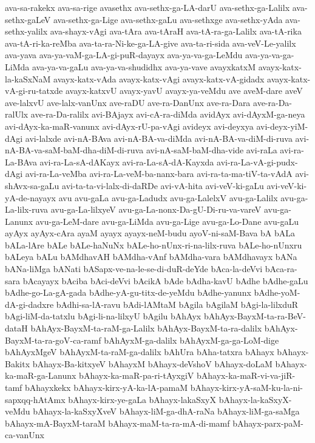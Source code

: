 {ava-sa-rakekx
ava-sa-rige
avasethx
ava-sethx-ga-LA-darU
ava-sethx-ga-Lalilx
ava-sethx-gaLeV
ava-sethx-ga-Lige
ava-sethx-gaLu
ava-sethxge
ava-sethx-yAda
ava-sethx-yalilx
ava-shayx-vAgi
ava-tAra
ava-tAraH
ava-tA-ra-ga-Lalilx
ava-tA-rika
ava-tA-ri-ka-reMba
ava-ta-ra-Ni-ke-ga-LA-give
ava-ta-ri-sida
ava-veV-Le-yalilx
ava-yava
ava-ya-vaM-ga-LA-gi-puR-dayayx
ava-ya-va-ga-LeMdu
ava-ya-va-ga-LiMda
ava-ya-va-gaLu
ava-ya-va-shudidhx
ava-ya-vave
avayxkatxM
avayx-katx-la-kaSxNaM
avayx-katx-vAda
avayx-katx-vAgi
avayx-katx-vA-gidadx
avayx-katx-vA-gi-ru-tatxde
avayx-katxvU
avayx-yavU
avayx-ya-veMdu
ave
aveM-dare
aveV
ave-lalxvU
ave-lalx-vanUnx
ave-raDU
ave-ra-DanUnx
ave-ra-Dara
ave-ra-Da-ralUlx
ave-ra-Da-ralilx
avi-BAjayx
avi-cA-ra-diMda
avidAyx
avi-dAyxM-ga-neya
avi-dAyx-ka-maR-vanunx
avi-dAyx-rU-pa-vAgi
avideyx
avi-deyxya
avi-deyx-yiM-dAgi
avi-lalxde
avi-nA-BAva
avi-nA-BA-va-diMda
avi-nA-BA-va-diM-di-ruva
avi-nA-BA-va-saM-baM-dha-diM-di-ruva
avi-nA-saM-baM-dha-vide
avi-raLa
avi-ra-La-BAva
avi-ra-La-sA-dAKayx
avi-ra-La-sA-dA-Kayxda
avi-ra-La-vA-gi-pudx-dAgi
avi-ra-La-veMba
avi-ra-La-veM-ba-nanx-bara
avi-ra-ta-ma-tiV-ta-vAdA
avi-shAvx-sa-gaLu
avi-ta-ta-vi-lalx-di-daRDe
avi-vA-hita
avi-veV-ki-gaLu
avi-veV-ki-yA-de-nayayx
avu
avu-gaLa
avu-ga-Ladudx
avu-ga-LalelxV
avu-ga-Lalilx
avu-ga-La-lilx-ruva
avu-ga-La-lilxyeV
avu-ga-La-nonx-Da-gU-Di-ru-va-vareV
avu-ga-Lanunx
avu-ga-LeM-dare
avu-ga-LiMda
avu-ga-Lige
avu-ga-Lo-Dane
avu-gaLu
ayAyx
ayAyx-cAra
ayaM
ayayx
ayayx-neM-budu
ayoV-ni-saM-Bava
bA
bALa
bALa-lAre
bALe
bALe-haNuNx
bALe-ho-nUnx-ri-na-lilx-ruva
bALe-ho-nUnxru
bALeya
bALu
bAMdhavAH
bAMdha-vAnf
bAMdha-vara
bAMdhavayx
bANa
bANa-liMga
bANati
bASapx-ve-na-le-se-di-duR-deYde
bAca-la-deVvi
bAca-ra-sara
bAcayayx
bAciba
bAci-deVvi
bAcikA
bAde
bAdha-kavU
bAdhe
bAdhe-gaLu
bAdhe-go-La-gA-gada
bAdhe-yA-gu-titx-de-yeMdu
bAdhe-yanunx
bAdhe-yoM-dA-gi-dadxre
bAdhi-sa-lA-ravu
bAdi-lAMtaM
bAgila
bAgilaM
bAgi-la-lilxduR
bAgi-liM-da-tatxlu
bAgi-li-na-lilxyU
bAgilu
bAhAyx
bAhAyx-BayxM-ta-ra-BeV-dataH
bAhAyx-BayxM-ta-raM-ga-Lalilx
bAhAyx-BayxM-ta-ra-dalilx
bAhAyx-BayxM-ta-ra-goV-ca-ramf
bAhAyxM-ga-dalilx
bAhAyxM-ga-ga-LoM-dige
bAhAyxMgeV
bAhAyxM-ta-raM-ga-dalilx
bAhUra
bAha-tatxra
bAhayx
bAhayx-Bakitx
bAhayx-Ba-kitxyeV
bAhayxM
bAhayx-deVshoV
bAhayx-doLaM
bAhayx-ka-maR-ga-Lanunx
bAhayx-ka-maR-pa-ri-tAyxgiV
bAhayx-ka-maR-vi-va-jiR-tamf
bAhayxkekx
bAhayx-kirx-yA-ka-lA-pamaM
bAhayx-kirx-yA-saM-ku-la-ni-sapxqq-hAtAmx
bAhayx-kirx-ye-gaLa
bAhayx-lakaSxyX
bAhayx-la-kaSxyX-veMdu
bAhayx-la-kaSxyXveV
bAhayx-liM-ga-dhA-raNa
bAhayx-liM-ga-saMga
bAhayx-mA-BayxM-taraM
bAhayx-maM-ta-ra-mA-di-mamf
bAhayx-parx-paM-ca-vanUnx
}
